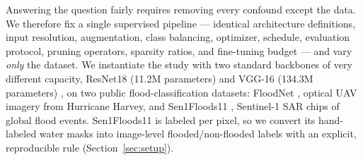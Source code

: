 \documentclass[conference]{IEEEtran}
\newif\ifreview
\newcommand{\REV}[1]{\ifreview\textcolor{red}{\textbf{[Revise: #1]}}\fi}
\begin{document}
Answering the question fairly requires removing every confound except
the data. We therefore fix a single supervised pipeline --- identical
architecture definitions, input resolution, augmentation, class
balancing, optimizer, schedule, evaluation protocol, pruning
operators, sparsity ratios, and fine-tuning budget --- and vary
\emph{only} the dataset. We instantiate the study with two standard
backbones of very different capacity, ResNet18 (11.2M parameters)
\cite{he2016resnet} and VGG-16 (134.3M parameters)
\cite{simonyan2015vgg}, on two public flood-classification datasets:
FloodNet \cite{rahnemoonfar2021floodnet}, optical UAV imagery from
Hurricane Harvey, and Sen1Floods11 \cite{bonafilia2020sen1floods11},
Sentinel-1 SAR chips of global flood events. Sen1Floods11 is labeled
per pixel, so we convert its hand-labeled water masks into image-level
flooded/non-flooded labels with an explicit, reproducible rule
(Section~\ref{sec:setup}).
\REV{[A3] ``remove every confound except the data'' is strong: the
datasets also differ in size, resolution, class balance and label
origin (you say so yourself in Limitations). Reword to ``hold the
pipeline fixed and vary the dataset''. [A4] Terminology: Sen1Floods11
water masks include \emph{permanent water} (rivers, lakes), so a chip
with $\geq1\%$ water is ``water-containing'', not necessarily
``flooded''. Either rename the classes (water / no-water) or explain
and discuss this explicitly (the dataset provides a permanent-water
layer; see B3).}
\end{document}
